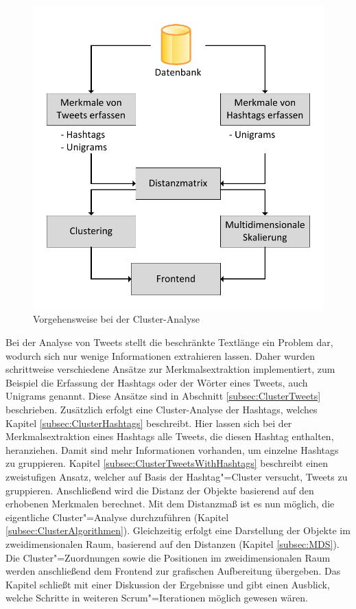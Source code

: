 \begin{figure}[ht]
 \centering
 \includegraphics[scale=0.7]{./Bilder/Clustering/ClusteringAufbau.pdf}
\caption{Vorgehensweise bei der Cluster-Analyse}
\label{fig:ClusterVorgehen}
\end{figure}

Bei der Analyse von Tweets stellt die beschränkte Textlänge ein Problem dar, 
wodurch sich nur wenige Informationen extrahieren lassen. Daher wurden schrittweise 
verschiedene Ansätze zur Merkmalsextraktion implementiert, zum Beispiel die Erfassung der 
Hashtags oder der Wörter eines Tweets, auch Unigrams genannt. Diese Ansätze sind in Abschnitt \ref{subsec:ClusterTweets} beschrieben.
Zusätzlich erfolgt eine Cluster-Analyse der Hashtags, welches Kapitel \ref{subsec:ClusterHashtags} beschreibt. 
Hier lassen sich bei der Merkmalsextraktion eines Hashtags alle Tweets, die diesen Hashtag enthalten, heranziehen. 
Damit sind mehr Informationen vorhanden, um einzelne Hashtags zu gruppieren.
Kapitel \ref{subsec:ClusterTweetsWithHashtags} beschreibt einen zweistufigen Ansatz, 
welcher auf Basis der Hashtag"=Cluster versucht, Tweets zu gruppieren. 
Anschließend wird die Distanz der Objekte basierend auf den erhobenen Merkmalen berechnet. 
Mit dem Distanzmaß ist es nun möglich, die eigentliche Cluster"=Analyse 
durch\-zu\-füh\-ren (Kapitel \ref{subsec:ClusterAlgorithmen}). 
Gleichzeitig erfolgt eine Darstellung der Objekte im zweidimensionalen Raum, 
basierend auf den Distanzen (Kapitel \ref{subsec:MDS}). 
Die Cluster"=Zuordnungen sowie die Positionen im zweidimensionalen Raum werden 
anschließend dem Frontend zur grafischen Aufbereitung übergeben.
Das Kapitel schließt mit einer Diskussion der Ergebnisse und gibt einen Ausblick, 
welche Schritte in wei\-te\-ren Scrum"=Iterationen möglich gewesen wären.

